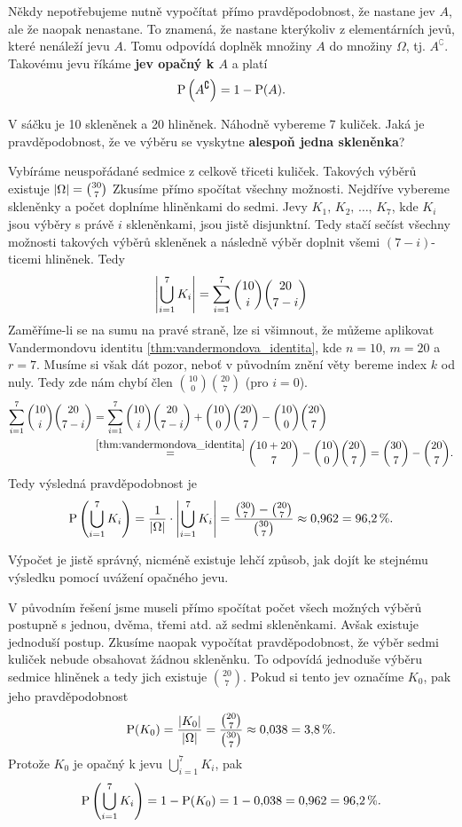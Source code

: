 \begin{remark}
    Někdy nepotřebujeme nutně vypočítat přímo pravděpodobnost, že nastane jev $A$, ale že naopak nenastane. To znamená, že nastane kterýkoliv z elementárních jevů, které nenáleží jevu $A$. Tomu odpovídá doplněk množiny $A$ do množiny $\Omega$, tj. $A^\complement$. Takovému jevu říkáme \textbf{jev opačný k $A$} a platí
    \[\operatorname{\text{P}}\left(A^\complement\right)=1-\operatorname{\text{P}}(A).\]
\end{remark}
\begin{task}
    V sáčku je 10 skleněnek a 20 hliněnek. Náhodně vybereme 7 kuliček. Jaká je pravděpodobnost, že ve výběru se vyskytne \textbf{alespoň jedna skleněnka}?
\end{task}
\begin{solution}
    Vybíráme neuspořádané sedmice z celkově třiceti kuliček. Takových výběrů existuje $\left| \Omega \right|=\binom{30}{7}$ Zkusíme přímo spočítat všechny možnosti. Nejdříve vybereme skleněnky a počet doplníme hliněnkami do sedmi. Jevy $K_1,\,K_2,\,\dots,\,K_7$, kde $K_i$ jsou výběry s právě $i$ skleněnkami, jsou jistě disjunktní. Tedy stačí sečíst všechny možnosti takových výběrů skleněnek a následně výběr doplnit všemi $(7-i)$-ticemi hliněnek. Tedy
    \[\left| \bigcup\limits_{i=1}^{7}K_i \right|=\sum_{i=1}^{7}\binom{10}{i}\binom{20}{7-i}\]
    Zaměříme-li se na sumu na pravé straně, lze si všimnout, že můžeme aplikovat Vandermondovu identitu \ref{thm:vandermondova_identita}, kde $n=10$, $m=20$ a $r=7$. Musíme si však dát pozor, neboť v původním znění věty bereme index $k$ od nuly. Tedy zde nám chybí člen $\binom{10}{0}\binom{20}{7}$ (pro $i=0$).
    \begin{align*}
        \sum_{i=1}^{7}\binom{10}{i}\binom{20}{7-i}&=\sum_{i=1}^{7}\binom{10}{i}\binom{20}{7-i}+\binom{10}{0}\binom{20}{7}-\binom{10}{0}\binom{20}{7}\\
        &\stackrel{\ref{thm:vandermondova_identita}}{=}\binom{10+20}{7}-\binom{10}{0}\binom{20}{7}=\binom{30}{7}-\binom{20}{7}.
    \end{align*}
    Tedy výsledná pravděpodobnost je
    \[\operatorname{\text{P}}\left(\bigcup\limits_{i=1}^{7}K_i\right)=\dfrac{1}{\left| \Omega \right|}\cdot\left| \bigcup\limits_{i=1}^{7}K_i \right|=\dfrac{\binom{30}{7}-\binom{20}{7}}{\binom{30}{7}}\approx 0{,}962=96{,}2\,\%.\]
\end{solution}
Výpočet je jistě správný, nicméně existuje lehčí způsob, jak dojít ke stejnému výsledku pomocí uvážení opačného jevu.
\begin{solution}
    V původním řešení jsme museli přímo spočítat počet všech možných výběrů postupně s jednou, dvěma, třemi atd. až sedmi skleněnkami. Avšak existuje jednoduší postup. Zkusíme naopak vypočítat pravděpodobnost, že výběr sedmi kuliček nebude obsahovat žádnou skleněnku. To odpovídá jednoduše výběru sedmice hliněnek a tedy jich existuje $\binom{20}{7}$. Pokud si tento jev označíme $K_0$, pak jeho pravděpodobnost
    \[\operatorname{\text{P}}(K_0)=\dfrac{\left| K_0 \right|}{\left| \Omega \right|}=\dfrac{\binom{20}{7}}{\binom{30}{7}}\approx 0{,}038=3{,}8\,\%.\]
    Protože $K_0$ je opačný k jevu $\bigcup_{i=1}^{7}K_i$, pak
    \[\operatorname{\text{P}}\left(\bigcup\limits_{i=1}^{7}K_i\right)=1-\operatorname{\text{P}}(K_0)=1-0{,}038=0{,}962=96{,}2\,\%.\]
\end{solution}
